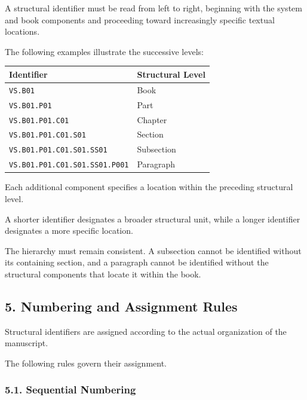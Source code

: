 A structural identifier must be read
from left to right, beginning with
the system and book components and
proceeding toward increasingly specific
textual locations.

The following examples illustrate
the successive levels:

\begin{center}
\begin{tabular}{ll}
    \toprule
    \textbf{Identifier} & \textbf{Structural Level} \\
    \midrule
    \texttt{VS.B01} & Book \\
    \texttt{VS.B01.P01} & Part \\
    \texttt{VS.B01.P01.C01} & Chapter \\
    \texttt{VS.B01.P01.C01.S01} & Section \\
    \texttt{VS.B01.P01.C01.S01.SS01}
        & Subsection \\
    \texttt{VS.B01.P01.C01.S01.SS01.P001}
        & Paragraph \\
    \bottomrule
\end{tabular}
\end{center}

Each additional component specifies
a location within the preceding
structural level.

A shorter identifier designates
a broader structural unit, while
a longer identifier designates
a more specific location.

The hierarchy must remain consistent.
A subsection cannot be identified
without its containing section,
and a paragraph cannot be identified
without the structural components
that locate it within the book.


\subsection*{5. Numbering and Assignment Rules}

Structural identifiers are assigned
according to the actual organization
of the manuscript.

The following rules govern their
assignment.

\subsubsection*{5.1. Sequential Numbering}

